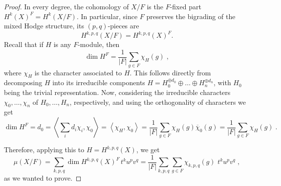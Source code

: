 \documentclass[11pt,english]{amsart}
\numberwithin{equation}{section}
\numberwithin{figure}{section}
\theoremstyle{plain}
\theoremstyle{plain}
\theoremstyle{definition}
\theoremstyle{remark}
\begin{document}
\begin{proof}
In every degree, the cohomology of $X/F$ is the $F$-fixed part $H^k(X)^F = H^k(X/F)$.
In particular, since $F$ preserves the bigrading of the mixed Hodge structure, its $(p,q)$-pieces are
$$
    H^{k,p,q}(X/F) = H^{k,p,q}(X)^F.
$$
Recall that if $H$ is any $F$-module, then
$$
    \dim H^F = \frac{1}{|F|} \sum_{g \in F} \chi_H(g)\; ,
$$
where $\chi_H$ is the character associated to $H$. This follows directly from decomposing $H$ into its irreducible components $H = H_0^{\oplus d_0} \oplus \ldots \oplus H_n^{\oplus d_n}$, with $H_0$ being the trivial representation. Now, considering the irreducible characters $\chi_0, \ldots, \chi_n$ of $H_0, \ldots, H_n$, respectively, and using the orthogonality of characters we get
$$
    \dim H^F = d_0 = \left\langle \sum_i d_i \chi_i, \chi_0 \right\rangle = \left\langle \chi_H, \chi_0 \right\rangle = \frac{1}{|F|} \sum_{g\in F} \chi_H(g)\overline{\chi}_0(g) = \frac{1}{|F|} \sum_{g\in F} \chi_H(g)\; .
$$

Therefore, applying this to $H = H^{k,p,q}(X)$, we get
$$
    \mu(X/F) = \sum_{k,p,q} \dim H^{k,p,q}(X)^F\,t^ku^pv^q = \frac{1}{|F|} \sum_{k,p,q} \sum_{g \in F} \chi_{k,p,q}(g)\,\,t^ku^pv^q\; ,
$$
as we wanted to prove.
\end{proof}
\end{document}
